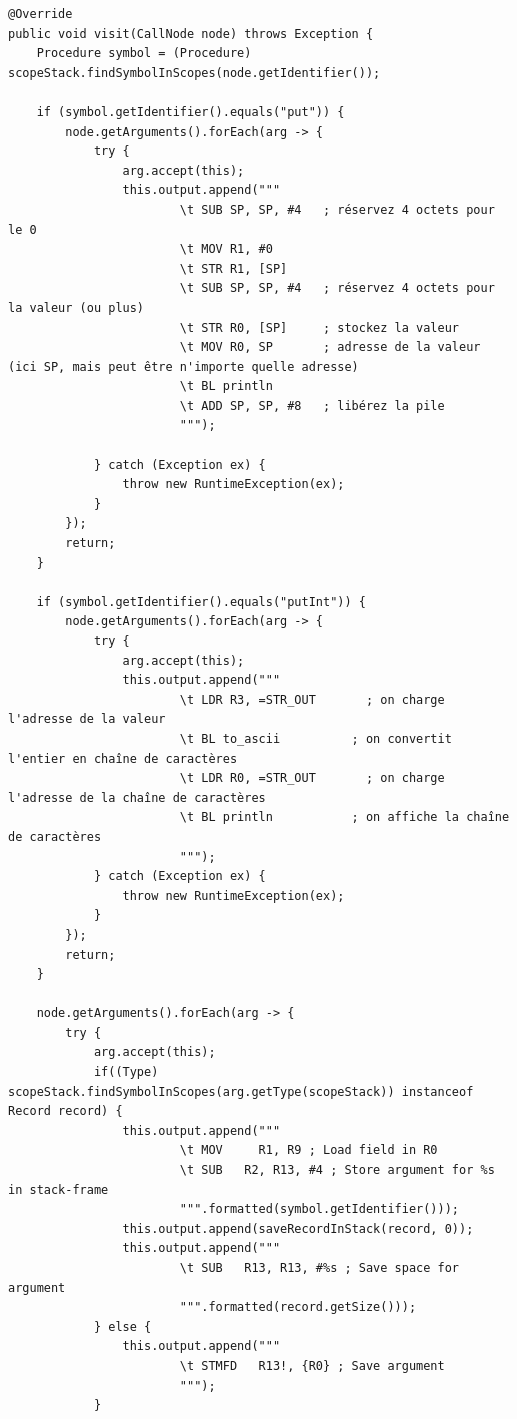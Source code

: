 \documentclass[french,a4paper]{article}
\begin{document}
    \begin{lstlisting}
@Override
public void visit(CallNode node) throws Exception {
    Procedure symbol = (Procedure) scopeStack.findSymbolInScopes(node.getIdentifier());

    if (symbol.getIdentifier().equals("put")) {
        node.getArguments().forEach(arg -> {
            try {
                arg.accept(this);
                this.output.append("""
                        \t SUB SP, SP, #4   ; réservez 4 octets pour le 0
                        \t MOV R1, #0
                        \t STR R1, [SP]
                        \t SUB SP, SP, #4   ; réservez 4 octets pour la valeur (ou plus)
                        \t STR R0, [SP]     ; stockez la valeur
                        \t MOV R0, SP       ; adresse de la valeur (ici SP, mais peut être n'importe quelle adresse)
                        \t BL println
                        \t ADD SP, SP, #8   ; libérez la pile
                        """);

            } catch (Exception ex) {
                throw new RuntimeException(ex);
            }
        });
        return;
    }

    if (symbol.getIdentifier().equals("putInt")) {
        node.getArguments().forEach(arg -> {
            try {
                arg.accept(this);
                this.output.append("""
                        \t LDR R3, =STR_OUT       ; on charge l'adresse de la valeur
                        \t BL to_ascii          ; on convertit l'entier en chaîne de caractères
                        \t LDR R0, =STR_OUT       ; on charge l'adresse de la chaîne de caractères
                        \t BL println           ; on affiche la chaîne de caractères
                        """);
            } catch (Exception ex) {
                throw new RuntimeException(ex);
            }
        });
        return;
    }

    node.getArguments().forEach(arg -> {
        try {
            arg.accept(this);
            if((Type) scopeStack.findSymbolInScopes(arg.getType(scopeStack)) instanceof Record record) {
                this.output.append("""
                        \t MOV     R1, R9 ; Load field in R0
                        \t SUB   R2, R13, #4 ; Store argument for %s in stack-frame
                        """.formatted(symbol.getIdentifier()));
                this.output.append(saveRecordInStack(record, 0));
                this.output.append("""
                        \t SUB   R13, R13, #%s ; Save space for argument
                        """.formatted(record.getSize()));
            } else {
                this.output.append("""
                        \t STMFD   R13!, {R0} ; Save argument
                        """);
            }


\end{lstlisting}
\end{document}
